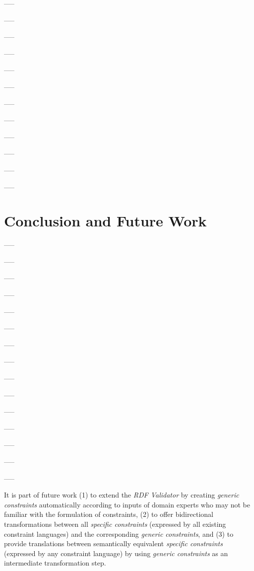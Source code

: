 \documentclass[a4paper,fontsize=11pt]{scrartcl}
\begin{document}
-----

-----

-----

-----

-----

-----

-----

-----

-----

-----

-----

-----

\section{Conclusion and Future Work}

-----

-----

-----

-----

-----

-----

-----

-----

-----

-----

-----

-----

-----

-----

-----

It is part of future work 
(1) to extend the \emph{RDF Validator} by creating \emph{generic constraints} automatically according to inputs of domain experts who may not be familiar with the formulation of constraints,
(2) to offer bidirectional transformations between all \emph{specific constraints} (expressed by all existing constraint languages) and the corresponding \emph{generic constraints}, and
(3) to provide translations between semantically equivalent \emph{specific constraints} (expressed by any constraint language) by using \emph{generic constraints} as an intermediate transformation step.

{}

\setcounter{tocdepth}{1}
\end{document}
